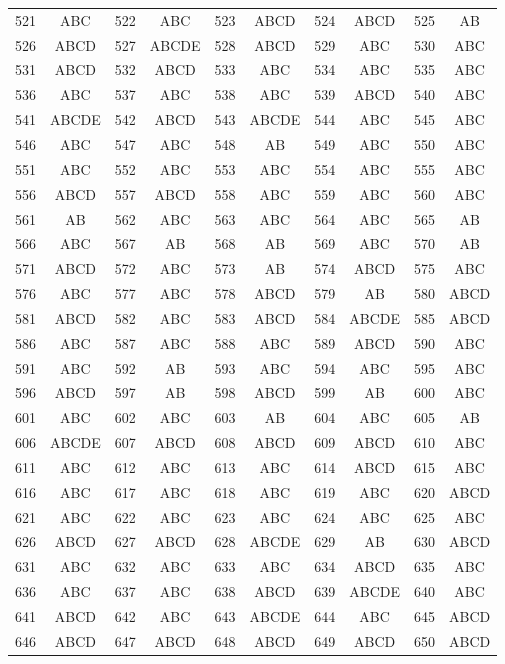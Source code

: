 \begin{longtable}{cc|cc|cc|cc|cc}
521 & ABC & 522 & ABC & 523 & ABCD & 524 & ABCD & 525 & AB \\
526 & ABCD & 527 & ABCDE & 528 & ABCD & 529 & ABC & 530 & ABC \\
531 & ABCD & 532 & ABCD & 533 & ABC & 534 & ABC & 535 & ABC \\
536 & ABC & 537 & ABC & 538 & ABC & 539 & ABCD & 540 & ABC \\
541 & ABCDE & 542 & ABCD & 543 & ABCDE & 544 & ABC & 545 & ABC \\
546 & ABC & 547 & ABC & 548 & AB & 549 & ABC & 550 & ABC \\
551 & ABC & 552 & ABC & 553 & ABC & 554 & ABC & 555 & ABC \\
556 & ABCD & 557 & ABCD & 558 & ABC & 559 & ABC & 560 & ABC \\
561 & AB & 562 & ABC & 563 & ABC & 564 & ABC & 565 & AB \\
566 & ABC & 567 & AB & 568 & AB & 569 & ABC & 570 & AB \\
571 & ABCD & 572 & ABC & 573 & AB & 574 & ABCD & 575 & ABC \\
576 & ABC & 577 & ABC & 578 & ABCD & 579 & AB & 580 & ABCD \\
581 & ABCD & 582 & ABC & 583 & ABCD & 584 & ABCDE & 585 & ABCD \\
586 & ABC & 587 & ABC & 588 & ABC & 589 & ABCD & 590 & ABC \\
591 & ABC & 592 & AB & 593 & ABC & 594 & ABC & 595 & ABC \\
596 & ABCD & 597 & AB & 598 & ABCD & 599 & AB & 600 & ABC \\
601 & ABC & 602 & ABC & 603 & AB & 604 & ABC & 605 & AB \\
606 & ABCDE & 607 & ABCD & 608 & ABCD & 609 & ABCD & 610 & ABC \\
611 & ABC & 612 & ABC & 613 & ABC & 614 & ABCD & 615 & ABC \\
616 & ABC & 617 & ABC & 618 & ABC & 619 & ABC & 620 & ABCD \\
621 & ABC & 622 & ABC & 623 & ABC & 624 & ABC & 625 & ABC \\
626 & ABCD & 627 & ABCD & 628 & ABCDE & 629 & AB & 630 & ABCD \\
631 & ABC & 632 & ABC & 633 & ABC & 634 & ABCD & 635 & ABC \\
636 & ABC & 637 & ABC & 638 & ABCD & 639 & ABCDE & 640 & ABC \\
641 & ABCD & 642 & ABC & 643 & ABCDE & 644 & ABC & 645 & ABCD \\
646 & ABCD & 647 & ABCD & 648 & ABCD & 649 & ABCD & 650 & ABCD \\

\end{longtable}
